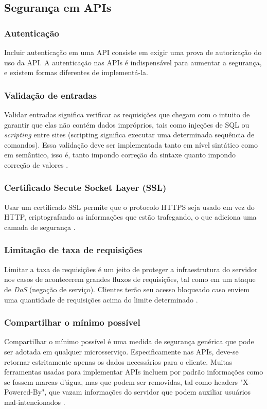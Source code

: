\subsection{Segurança em APIs}

\subsubsection*{Autenticação}

Incluir autenticação em uma API consiste em exigir uma prova de autorização do uso da API. A autenticação nas APIs é indispensável para aumentar a segurança, e existem formas diferentes de implementá-la.

\subsubsection*{Validação de entradas}

Validar entradas significa verificar as requisições que chegam com o intuito de garantir que elas não contém dados impróprios, tais como injeções de SQL ou \emph{scripting} entre sites (scripting significa executar uma determinada sequência de comandos). Essa validação deve ser implementada tanto em nível sintático como em semântico, isso é, tanto impondo correção da sintaxe quanto impondo correção de valores \cite{rapidAPI-twitter}.

\subsubsection*{Certificado Secute Socket Layer (SSL)}
Usar um certificado SSL permite que o protocolo HTTPS seja usado em vez do HTTP, criptografando as informações que estão trafegando, o que adiciona uma camada de segurança \cite{rapidAPI-twitter}.

\subsubsection*{Limitação de taxa de requisições}
Limitar a taxa de requisições é um jeito de proteger a infraestrutura do servidor nos casos de acontecerem grandes fluxos de requisições, tal como em um ataque de \emph{DoS} (negação de serviço). Clientes terão seu acesso bloqueado caso enviem uma quantidade de requisições acima do limite determinado \cite{rapidAPI-twitter}.

\subsubsection*{Compartilhar o mínimo possível}
Compartilhar o mínimo possível é uma medida de segurança genérica que pode ser adotada em qualquer microsserviço. Especificamente nas APIs, deve-se retornar estritamente apenas os dados necessários para o cliente. Muitas ferramentas usadas para implementar APIs incluem por padrão informações como se fossem marcas d'água, mas que podem ser removidas, tal como headers "X-Powered-By", que vazam informações do servidor que podem auxiliar usuários mal-intencionados \cite{rapidAPI-twitter}.

